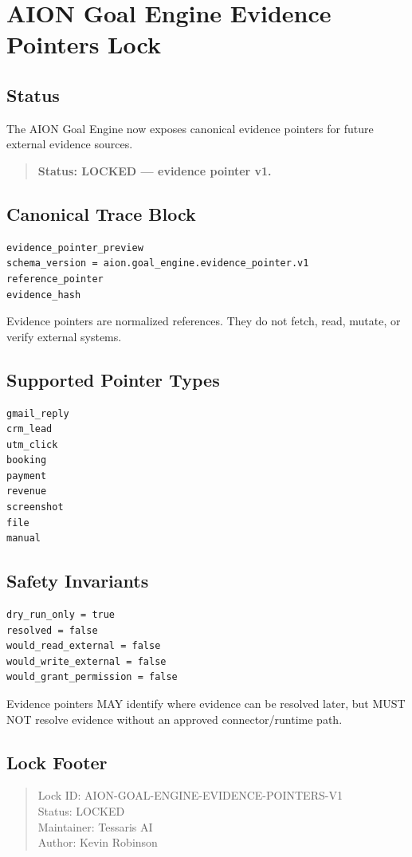 \section{AION Goal Engine Evidence Pointers Lock}
\label{sec:aion-goal-engine-evidence-pointers-lock}

\subsection{Status}

The AION Goal Engine now exposes canonical evidence pointers for future external evidence sources.

\begin{quote}
\textbf{Status: LOCKED --- evidence pointer v1.}
\end{quote}

\subsection{Canonical Trace Block}

\begin{verbatim}
evidence_pointer_preview
schema_version = aion.goal_engine.evidence_pointer.v1
reference_pointer
evidence_hash
\end{verbatim}

Evidence pointers are normalized references. They do not fetch, read, mutate, or verify external systems.

\subsection{Supported Pointer Types}

\begin{verbatim}
gmail_reply
crm_lead
utm_click
booking
payment
revenue
screenshot
file
manual
\end{verbatim}

\subsection{Safety Invariants}

\begin{verbatim}
dry_run_only = true
resolved = false
would_read_external = false
would_write_external = false
would_grant_permission = false
\end{verbatim}

Evidence pointers MAY identify where evidence can be resolved later, but MUST NOT resolve evidence without an approved connector/runtime path.

\subsection{Lock Footer}

\begin{quote}
Lock ID: AION-GOAL-ENGINE-EVIDENCE-POINTERS-V1\\
Status: LOCKED\\
Maintainer: Tessaris AI\\
Author: Kevin Robinson
\end{quote}
